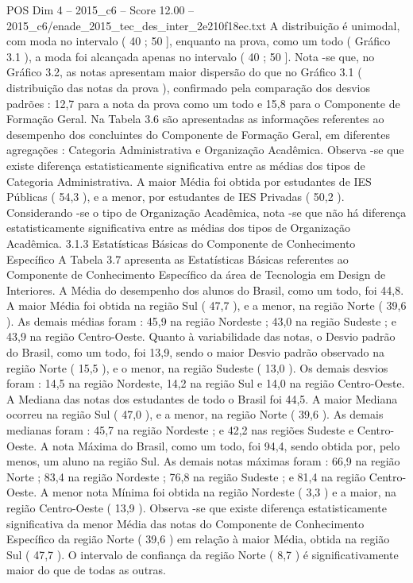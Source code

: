 \begin{textsample}{POS Dim 4 – 2015\_c6 – Score 12.00 – 2015\_c6/enade\_2015\_tec\_des\_inter\_2e210f18ec.txt}
A distribuição é unimodal, com moda no intervalo ( 40 ; 50 ], enquanto na prova, como um todo ( Gráfico 3.1 ), a moda foi alcançada apenas no intervalo ( 40 ; 50 ].
Nota -se que, no Gráfico 3.2, as notas apresentam maior dispersão do que no Gráfico 3.1 ( distribuição das notas da prova ), confirmado pela comparação dos desvios padrões : 12,7 para a nota da prova como um todo e 15,8 para o Componente de Formação Geral.
Na Tabela 3.6 são apresentadas as informações referentes ao desempenho dos concluintes do Componente de Formação Geral, em diferentes agregações : Categoria Administrativa e Organização Acadêmica.
Observa -se que existe diferença estatisticamente significativa entre as médias dos tipos de Categoria Administrativa.
A maior Média foi obtida por estudantes de IES Públicas ( 54,3 ), e a menor, por estudantes de IES Privadas ( 50,2 ).
Considerando -se o tipo de Organização Acadêmica, nota -se que não há diferença estatisticamente significativa entre as médias dos tipos de Organização Acadêmica. 3.1.3 Estatísticas Básicas do Componente de Conhecimento Específico A Tabela 3.7 apresenta as Estatísticas Básicas referentes ao Componente de Conhecimento Específico da área de Tecnologia em Design de Interiores.
A Média do desempenho dos alunos do Brasil, como um todo, foi 44,8.
A maior Média foi obtida na região Sul ( 47,7 ), e a menor, na região Norte ( 39,6 ).
As demais médias foram : 45,9 na região Nordeste ; 43,0 na região Sudeste ; e 43,9 na região Centro-Oeste.
Quanto à variabilidade das notas, o Desvio padrão do Brasil, como um todo, foi 13,9, sendo o maior Desvio padrão observado na região Norte ( 15,5 ), e o menor, na região Sudeste ( 13,0 ).
Os demais desvios foram : 14,5 na região Nordeste, 14,2 na região Sul e 14,0 na região Centro-Oeste.
A Mediana das notas dos estudantes de todo o Brasil foi 44,5.
A maior Mediana ocorreu na região Sul ( 47,0 ), e a menor, na região Norte ( 39,6 ).
As demais medianas foram : 45,7 na região Nordeste ; e 42,2 nas regiões Sudeste e Centro-Oeste.
A nota Máxima do Brasil, como um todo, foi 94,4, sendo obtida por, pelo menos, um aluno na região Sul.
As demais notas máximas foram : 66,9 na região Norte ; 83,4 na região Nordeste ; 76,8 na região Sudeste ; e 81,4 na região Centro-Oeste.
A menor nota Mínima foi obtida na região Nordeste ( 3,3 ) e a maior, na região Centro-Oeste ( 13,9 ).
Observa -se que existe diferença estatisticamente significativa da menor Média das notas do Componente de Conhecimento Específico da região Norte ( 39,6 ) em relação à maior Média, obtida na região Sul ( 47,7 ).
O intervalo de confiança da região Norte ( 8,7 ) é significativamente maior do que de todas as outras.

\end{textsample}
